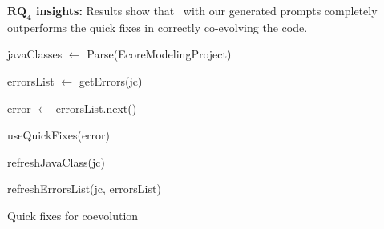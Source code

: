 \begin{tcolorbox}[boxsep=-2pt]
	\textbf{$\boldsymbol{RQ_4}$ insights:}
	Results show that \LLM~with our generated prompts completely outperforms the quick fixes in correctly co-evolving the code. 
\end{tcolorbox}




\begin{algorithm2e}[t]
	\small
	\SetAlgoLined
	javaClasses $\leftarrow$ Parse(EcoreModelingProject)
	
	{
		errorsList $\leftarrow $ getErrors(jc)
		
		{
			error  $\leftarrow$ errorsList.next()
			
			
			{
				useQuickFixes(error) %
			}
			
			
			refreshJavaClass(jc) 
			
			refreshErrorsList(jc, errorsList)
		}
		
	}
	
	\caption{Quick fixes for coevolution}
	\label{algo :quickfixes}
\end{algorithm2e}



